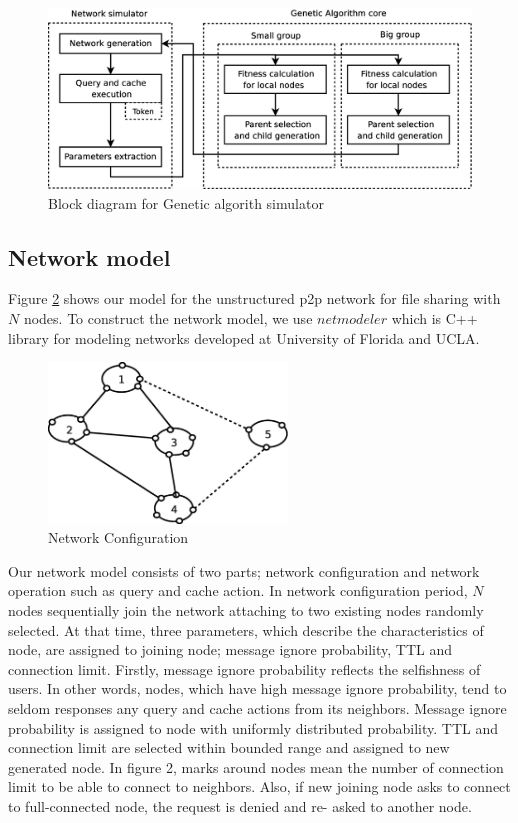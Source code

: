 \documentclass[12pt,journal,draftcls,letterpaper,onecolumn]{IEEEtran}
\begin{document}
\begin{figure}
\centering
\includegraphics[width=5.2in]{simblock}
\caption{Block diagram for Genetic algorith simulator} 
\label{fig:simblock}
\end{figure}

\subsection{Network model}\label{sec:netmodel}
Figure \ref{fig:network} shows our model for the unstructured p2p network for file sharing with
$N$ nodes. To construct the network model, we use $netmodeler$ which is C++ library for
modeling networks developed at University of Florida and UCLA\cite{netmodeler}.

\begin{figure}
\centering
\includegraphics[width=2.5in]{network}
\caption{Network Configuration} 
\label{fig:network}
\end{figure}

Our network model consists of two parts; network configuration and network operation such
as query and cache action. In network configuration period, $N$ nodes sequentially join the
network attaching to two existing nodes randomly selected. At that time, three parameters,
which describe the characteristics of node, are assigned to joining node; message ignore
probability, TTL and connection limit. Firstly, message ignore probability reflects the
selfishness of users. In other words, nodes, which have high message ignore probability, tend
to seldom responses any query and cache actions from its neighbors. Message ignore
probability is assigned to node with uniformly distributed probability. TTL and connection
limit are selected within bounded range and assigned to new generated node. In figure 2,
marks around nodes mean the number of connection limit to be able to connect to neighbors.
Also, if new joining node asks to connect to full-connected node, the request is denied and re-
asked to another node.
\end{document}
